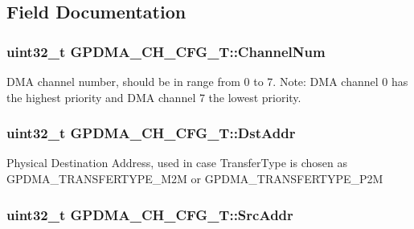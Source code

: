 \subsection{Field Documentation}
\hypertarget{structGPDMA__CH__CFG__T_a9a37cb463108848cc37e79d230f34602}{
\subsubsection[{Channel\-Num}]{\setlength{\rightskip}{0pt plus 5cm}uint32\-\_\-t G\-P\-D\-M\-A\-\_\-\-C\-H\-\_\-\-C\-F\-G\-\_\-\-T\-::\-Channel\-Num}}\label{structGPDMA__CH__CFG__T_a9a37cb463108848cc37e79d230f34602}
D\-M\-A channel number, should be in range from 0 to 7. Note\-: D\-M\-A channel 0 has the highest priority and D\-M\-A channel 7 the lowest priority. \hypertarget{structGPDMA__CH__CFG__T_a6e67f866c02d9a27662c798bac0554b8}{
\subsubsection[{Dst\-Addr}]{\setlength{\rightskip}{0pt plus 5cm}uint32\-\_\-t G\-P\-D\-M\-A\-\_\-\-C\-H\-\_\-\-C\-F\-G\-\_\-\-T\-::\-Dst\-Addr}}\label{structGPDMA__CH__CFG__T_a6e67f866c02d9a27662c798bac0554b8}
Physical Destination Address, used in case Transfer\-Type is chosen as G\-P\-D\-M\-A\-\_\-\-T\-R\-A\-N\-S\-F\-E\-R\-T\-Y\-P\-E\-\_\-\-M2\-M or G\-P\-D\-M\-A\-\_\-\-T\-R\-A\-N\-S\-F\-E\-R\-T\-Y\-P\-E\-\_\-\-P2\-M \hypertarget{structGPDMA__CH__CFG__T_a53adde93dea1ba4ce81af0fd4bd3e66e}{
\subsubsection[{Src\-Addr}]{\setlength{\rightskip}{0pt plus 5cm}uint32\-\_\-t G\-P\-D\-M\-A\-\_\-\-C\-H\-\_\-\-C\-F\-G\-\_\-\-T\-::\-Src\-Addr}}\label{structGPDMA__CH__CFG__T_a53adde93dea1ba4ce81af0fd4bd3e66e}
